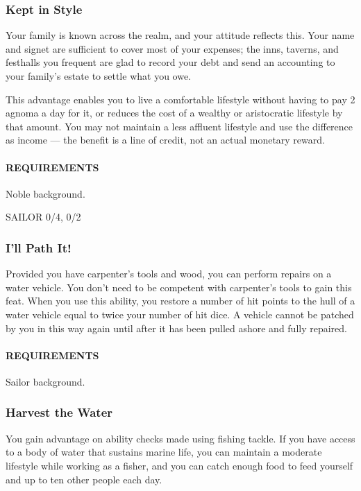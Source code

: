     \subsubsection{Kept in Style} \label{feat::keptinstyle}
    Your family is known across the realm, and your attitude reflects this.
    Your name and signet are sufficient to cover most of your expenses; the inns, taverns, and festhalls you frequent are glad to record your debt and send an accounting to your family's estate to settle what you owe.

    This advantage enables you to live a comfortable lifestyle without having to pay 2 agnoma a day for it, or reduces the cost of a wealthy or aristocratic lifestyle by that amount.
    You may not maintain a less affluent lifestyle and use the difference as income --- the benefit is a line of credit, not an actual monetary reward.
    \paragraph{REQUIREMENTS} Noble background.

SAILOR 0/4, 0/2
    \subsubsection{I'll Path It!} \label{feat::illpatchit}
    Provided you have carpenter's tools and wood, you can perform repairs on a water vehicle.
    You don't need to be competent with carpenter's tools to gain this feat.
    When you use this ability, you restore a number of hit points to the hull of a water vehicle equal to twice your number of hit dice.
    A vehicle cannot be patched by you in this way again until after it has been pulled ashore and fully repaired.
    \paragraph{REQUIREMENTS} Sailor background.

    \subsubsection{Harvest the Water} \label{feat::harvestthewater}
    You gain advantage on ability checks made using fishing tackle.
    If you have access to a body of water that sustains marine life, you can maintain a moderate lifestyle while working as a fisher, and you can catch enough food to feed yourself and up to ten other people each day.
